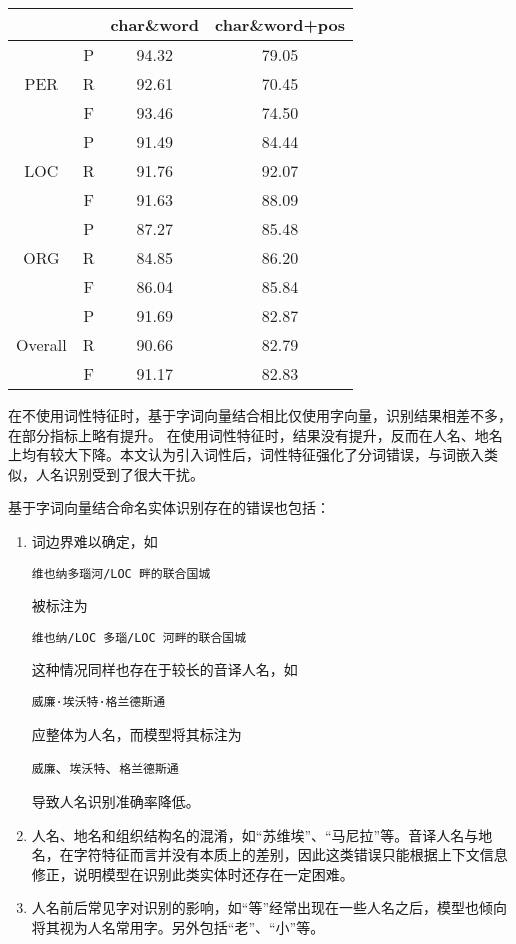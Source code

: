 \begin{table}[H]
    \centering
    \begin{tabular}{cccc}
        \toprule
        && char\&word & char\&word+pos\\
        \midrule
        \multirow{3}{*}{PER} & P & 94.32 & 79.05\\
        & R & 92.61 & 70.45\\
        & F & 93.46 & 74.50 \\
        \midrule
        \multirow{3}{*}{LOC} & P & 91.49 & 84.44\\
        & R & 91.76 & 92.07 \\
        & F & 91.63 & 88.09\\
        \midrule
        \multirow{3}{*}{ORG} & P & 87.27 & 85.48\\
        & R & 84.85 & 86.20\\
        & F & 86.04 & 85.84\\
        \midrule
        \multirow{3}{*}{Overall} & P & 91.69 & 82.87\\
        & R & 90.66 & 82.79\\
        & F & 91.17  & 82.83\\
        \bottomrule
    \end{tabular}
    \label{tab:word_char_comparison}
\end{table}
在不使用词性特征时，基于字词向量结合相比仅使用字向量，识别结果相差不多，在部分指标上略有提升。
在使用词性特征时，结果没有提升，反而在人名、地名上均有较大下降。本文认为引入词性后，词性特征强化了分词错误，与词嵌入类似，人名识别受到了很大干扰。

基于字词向量结合命名实体识别存在的错误也包括：
\begin{enumerate}[leftmargin=*]
    \item 词边界难以确定，如
        \begin{center}
            \verb|维也纳多瑙河/LOC 畔的联合国城|
        \end{center}
        被标注为
        \begin{center}
            \verb|维也纳/LOC 多瑙/LOC 河畔的联合国城|
        \end{center}
        这种情况同样也存在于较长的音译人名，如
        \begin{center}
            \verb|威廉·埃沃特·格兰德斯通|
        \end{center}
        应整体为人名，而模型将其标注为
        \begin{center}
            \verb|威廉|、\verb|埃沃特|、\verb|格兰德斯通|
        \end{center}
        导致人名识别准确率降低。
    \item 人名、地名和组织结构名的混淆，如“苏维埃”、“马尼拉”等。音译人名与地名，在字符特征而言并没有本质上的差别，因此这类错误只能根据上下文信息修正，说明模型在识别此类实体时还存在一定困难。
    \item 人名前后常见字对识别的影响，如“等”经常出现在一些人名之后，模型也倾向将其视为人名常用字。另外包括“老”、“小”等。
\end{enumerate}


